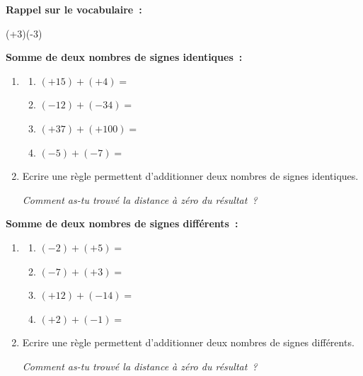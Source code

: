 \documentclass[activite]{thedocument}
\begin{document}
    {\bfseries\large Rappel sur le vocabulaire~:}\vskip20pt
    {\centering\hfil(+3)\hfil(-3)\hfil\par}\vskip50pt
    {\bfseries\large Somme de deux nombres de signes identiques~:}\vskip10pt
    \begin{enumerate}
    \item \begin{enumerate}
        \item $(+15)+(+4)=$
        \item $(-12)+(-34)=$
        \item $(+37)+(+100)=$
        \item $(-5)+(-7)=$
    \end{enumerate}
    \item Ecrire une règle permettent d'additionner deux nombres de signes
    identiques.\vskip70pt\par\noindent
    {\itshape Comment as-tu trouvé la distance à zéro du résultat~?}
\end{enumerate}
    {\bfseries\large Somme de deux nombres de signes différents~:}\vskip10pt
    \begin{enumerate}
    \item \begin{enumerate}
        \item $(-2)+(+5)=$
        \item $(-7)+(+3)=$
        \item $(+12)+(-14)=$
        \item $(+2)+(-1)=$
    \end{enumerate}
    \item Ecrire une règle permettent d'additionner deux nombres de signes
    différents.\vskip70pt\par\noindent
    {\itshape Comment as-tu trouvé la distance à zéro du résultat~?}
\end{enumerate}
\end{document}
